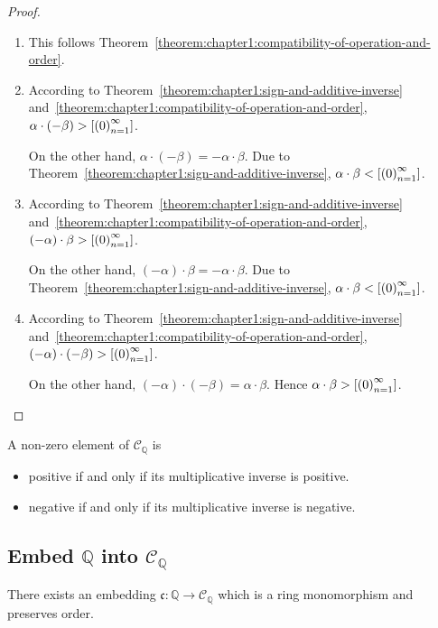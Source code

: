 \begin{proof}
    \begin{enumerate}[label={(\roman*)}]
        \item This follows Theorem~\ref{theorem:chapter1:compatibility-of-operation-and-order}.
        \item According to Theorem~\ref{theorem:chapter1:sign-and-additive-inverse} and~\ref{theorem:chapter1:compatibility-of-operation-and-order}, $\alpha\cdot(-\beta) > \left[{{\left({0}\right)}^{\infty}_{n=1}}\right]$.

              On the other hand, $\alpha\cdot(-\beta) = -\alpha\cdot\beta$. Due to Theorem~\ref{theorem:chapter1:sign-and-additive-inverse}, $\alpha\cdot\beta < \left[{{\left({0}\right)}^{\infty}_{n=1}}\right]$.
        \item According to Theorem~\ref{theorem:chapter1:sign-and-additive-inverse} and~\ref{theorem:chapter1:compatibility-of-operation-and-order}, $(-\alpha)\cdot\beta > \left[{{\left({0}\right)}^{\infty}_{n=1}}\right]$.

              On the other hand, $(-\alpha)\cdot\beta = -\alpha\cdot\beta$. Due to Theorem~\ref{theorem:chapter1:sign-and-additive-inverse}, $\alpha\cdot\beta < \left[{{\left({0}\right)}^{\infty}_{n=1}}\right]$.
        \item According to Theorem~\ref{theorem:chapter1:sign-and-additive-inverse} and~\ref{theorem:chapter1:compatibility-of-operation-and-order}, $(-\alpha)\cdot(-\beta) > \left[{{\left({0}\right)}^{\infty}_{n=1}}\right]$.

              On the other hand, $(-\alpha)\cdot(-\beta) = \alpha\cdot\beta$. Hence $\alpha\cdot\beta > \left[{{\left({0}\right)}^{\infty}_{n=1}}\right]$.\qedhere
    \end{enumerate}
\end{proof}

\begin{corollary}
    A non-zero element of $\mathscr{C}_{\mathbb{Q}}$ is
    \begin{itemize}
        \item positive if and only if its multiplicative inverse is positive.
        \item negative if and only if its multiplicative inverse is negative.
    \end{itemize}
\end{corollary}

\subsection{Embed $\mathbb{Q}$ into $\mathscr{C}_{\mathbb{Q}}$}

\begin{theorem}
    There exists an embedding $\mathfrak{c}: \mathbb{Q}\to\mathscr{C}_{\mathbb{Q}}$ which is a ring monomorphism and preserves order.
\end{theorem}

